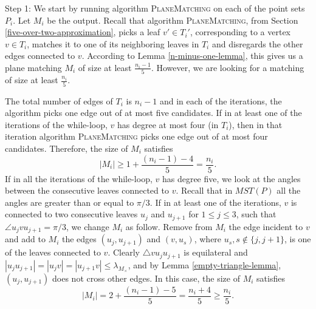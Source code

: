 \documentclass[11pt,a4paper]{article}
\newcommand{\MC}{M_\times}
\newcommand{\bt}{\lambda}
\begin{document}
\begin{paragraph}{Step 1:} 
We start by running algorithm {\scshape PlaneMatching} on each of the point sets $P_i$. Let $M_i$ be the output. Recall that algorithm {\scshape PlaneMatching}, from Section \ref{five-over-two-approximation}, picks a leaf $v'\in T_i'$, corresponding to a vertex $v \in T_i$, matches it to one of its neighboring leaves in $T_i$ and disregards the other edges connected to $v$. According to Lemma \ref{n-minus-one-lemma}, this gives us a plane matching $M_i$ of size at least $\frac{n_i-1}{5}$. However, we are looking for a matching of size at least $\frac{n_i}{5}$. 

 The total number of edges of $T_i$ is $n_i-1$ and in each of the iterations, the algorithm picks one edge out of at most five candidates. If in at least one of the iterations of the while-loop, $v$ has degree at most four (in $T_i$), then in that iteration algorithm {\scshape PlaneMatching} picks one edge out of at most four candidates. Therefore, the size of $M_i$ satisfies 
$$
 |M_i| \ge 1 + \frac{(n_i-1)-4}{5}=\frac{n_i}{5}.
$$
 If in all the iterations of the while-loop, $v$ has degree five, we look at the angles between the consecutive leaves connected to $v$. Recall that in $MST(P)$ all the angles are greater than or equal to $\pi/3$. If in at least one of the iterations, $v$ is connected to two consecutive leaves $u_j$ and $u_{j+1}$ for $1\le j\le 3$, such that $\angle u_jvu_{j+1} = \pi/3$, we change $M_i$ as follow. Remove from $M_i$ the edge incident to $v$ and add to $M_i$ the edges $(u_j,u_{j+1})$ and $(v,u_s)$, where $u_s, s\notin\{j, j+1\}$, is one of the leaves connected to $v$. Clearly $\bigtriangleup vu_ju_{j+1}$ is equilateral and $|u_ju_{j+1}| = |u_jv|=|u_{j+1}v|\le \bt_{\MC}$, and by Lemma \ref{empty-triangle-lemma}, $(u_j, u_{j+1})$ does not cross other edges. In this case, the size of $M_i$ satisfies 
$$
 |M_i| = 2+\frac{(n_i-1)-5}{5}=\frac{n_i+4}{5}\ge\frac{n_i}{5}.
$$

\end{paragraph}
\end{document}
